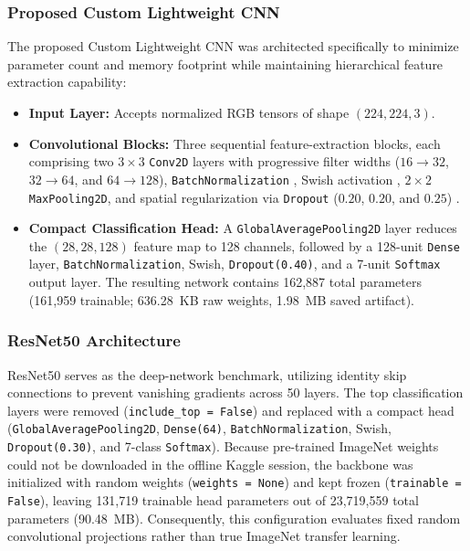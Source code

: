 \subsubsection{Proposed Custom Lightweight CNN}
The proposed Custom Lightweight CNN was architected specifically to minimize parameter count and memory footprint while maintaining hierarchical feature extraction capability:
\begin{itemize}
    \item \textbf{Input Layer:} Accepts normalized RGB tensors of shape $(224, 224, 3)$.
    \item \textbf{Convolutional Blocks:} Three sequential feature-extraction blocks, each comprising two $3 \times 3$ \texttt{Conv2D} layers with progressive filter widths ($16 \rightarrow 32$, $32 \rightarrow 64$, and $64 \rightarrow 128$), \texttt{BatchNormalization} \cite{ioffe2015batch}, Swish activation \cite{ramachandran2017swish}, $2 \times 2$ \texttt{MaxPooling2D}, and spatial regularization via \texttt{Dropout} ($0.20$, $0.20$, and $0.25$) \cite{srivastava2014dropout}.
    \item \textbf{Compact Classification Head:} A \texttt{GlobalAveragePooling2D} layer reduces the $(28, 28, 128)$ feature map to 128 channels, followed by a 128-unit \texttt{Dense} layer, \texttt{BatchNormalization}, Swish, \texttt{Dropout(0.40)}, and a 7-unit \texttt{Softmax} output layer. The resulting network contains 162,887 total parameters (161,959 trainable; 636.28~KB raw weights, 1.98~MB saved artifact).
\end{itemize}

\subsubsection{ResNet50 Architecture}
ResNet50 \cite{he2016deep} serves as the deep-network benchmark, utilizing identity skip connections to prevent vanishing gradients across 50 layers. The top classification layers were removed (\texttt{include\_top = False}) and replaced with a compact head (\texttt{GlobalAveragePooling2D}, \texttt{Dense(64)}, \texttt{BatchNormalization}, Swish, \texttt{Dropout(0.30)}, and 7-class \texttt{Softmax}). Because pre-trained ImageNet weights could not be downloaded in the offline Kaggle session, the backbone was initialized with random weights (\texttt{weights = None}) and kept frozen (\texttt{trainable = False}), leaving 131,719 trainable head parameters out of 23,719,559 total parameters (90.48~MB). Consequently, this configuration evaluates fixed random convolutional projections rather than true ImageNet transfer learning.

